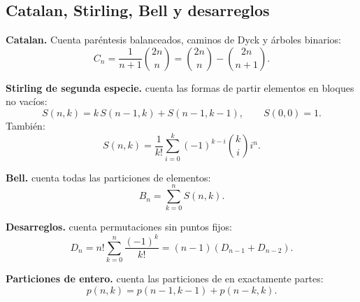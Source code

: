 \subsection{Catalan, Stirling, Bell y desarreglos}\label{rec:catalan}

\textbf{Catalan.} Cuenta paréntesis balanceados, caminos de Dyck y árboles
binarios:
\[
C_n=\frac{1}{n+1}\binom{2n}{n}
   =\binom{2n}{n}-\binom{2n}{n+1}.
\]

\textbf{Stirling de segunda especie.}  cuenta las formas de
partir  elementos en  bloques no vacíos:
\[
S(n,k)=k\,S(n-1,k)+S(n-1,k-1),\qquad S(0,0)=1.
\]
También:
\[
S(n,k)=\frac{1}{k!}\sum_{i=0}^{k}(-1)^{k-i}\binom{k}{i}i^n.
\]

\textbf{Bell.}  cuenta todas las particiones de 
elementos:
\[
B_n=\sum_{k=0}^{n}S(n,k).
\]

\textbf{Desarreglos.}  cuenta permutaciones sin puntos fijos:
\[
D_n=n!\sum_{k=0}^{n}\frac{(-1)^k}{k!}
   =(n-1)(D_{n-1}+D_{n-2}).
\]

\textbf{Particiones de entero.}  cuenta las particiones de
 en exactamente  partes:
\[
p(n,k)=p(n-1,k-1)+p(n-k,k).
\]

